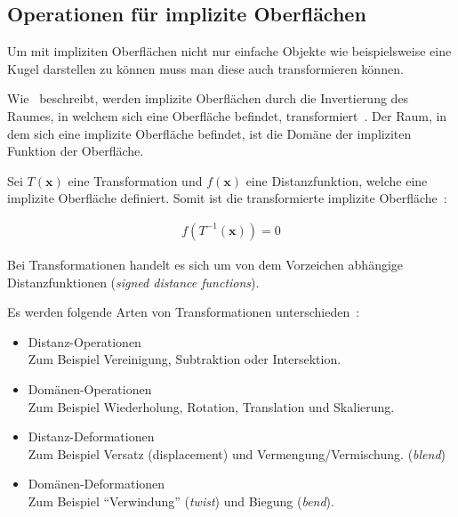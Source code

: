 
\subsection{Operationen für implizite Oberflächen}
\label{subsec:implicit_surfaces_ops}

Um mit impliziten Oberflächen nicht nur einfache Objekte wie
beispielsweise eine Kugel darstellen zu können muss man diese auch
transformieren können.

Wie~\citeauthor{hart_sphere_1994} beschreibt, werden implizite
Oberflächen durch die Invertierung des Raumes, in welchem sich eine
Oberfläche befindet, transformiert~\parencite[S. 543]{hart_sphere_1994}.
Der Raum, in dem sich eine implizite Oberfläche befindet, ist die Domäne
der impliziten Funktion der Oberfläche.

Sei $T(\bm{x})$ eine Transformation und $f(\bm{x})$ eine Distanzfunktion,
welche eine implizite Oberfläche definiert. Somit ist die transformierte
implizite Oberfläche~\parencite[S. 534]{hart_sphere_1994}:

\begin{gather}
    f(T^{-1}(\bm{x})) = 0
\end{gather}

Bei Transformationen handelt es sich um von dem Vorzeichen abhängige
Distanzfunktionen (\textit{signed distance functions}).

Es werden folgende Arten von Transformationen
unterschieden~\parencite[S. 14]{hart_ray_1993}:
\begin{itemize}
    \item{Distanz-Operationen}\\
        Zum Beispiel Vereinigung, Subtraktion oder Intersektion.
    \item{Domänen-Operationen}\\
        Zum Beispiel Wiederholung, Rotation, Translation und Skalierung.
    \item{Distanz-Deformationen}\\
        Zum Beispiel Versatz (displacement) und Vermengung/Vermischung.
        (\textit{blend})
    \item{Domänen-Deformationen}\\
        Zum Beispiel ``Verwindung'' (\textit{twist}) und Biegung
        (\textit{bend}).
\end{itemize}

